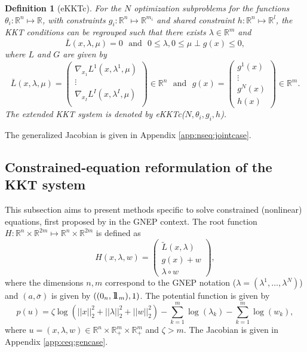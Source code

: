 \documentclass[11pt, a4paper]{article}
\newcommand{\II}{\mbox{\large 1\hskip -0,353em 1}}
\newcommand{\txtm}[1]{\textrm{~~#1~~}}
\newcommand{\R}{\ensuremath{\mathbb{R}}}
\newtheorem{mydef}{Definition}
\begin{document}
\begin{mydef}[eKKTc]
For the $N$ optimization subproblems for the functions $\theta_i: \R^{n} \mapsto \R$, with constraints $g_i: \R^{n} \mapsto \R^{m_i}$ and shared constraint $h:\R^n \mapsto \R^l$, the KKT conditions can be regrouped such that
there exists $\lambda \in \R^m$ and 
$$
\bar L(x, \lambda, \mu) = 0 \txtm{and} 0 \leq \lambda, 0 \leq \mu \perp g(x) \leq  0,
$$
where $L$ and $G$ are given by
$$
\bar L(x, \lambda, \mu) = 
\left( 
\begin{matrix}
\nabla_{x_1} L ^1(x, \lambda^1, \mu) \\
\vdots \\
\nabla_{x_I} L ^I(x, \lambda^I, \mu) \\
\end{matrix}
\right)  
\in \R^{n}
\txtm{and}
g(x) = 
\left( 
\begin{matrix}
g^1(x) \\
\vdots \\
g^N(x) \\
h(x) 
\end{matrix}
\right) 
\in \R^{m}.
$$
The extended KKT system is denoted by eKKTc($N, \theta_i, g_i, h$).
\end{mydef}
The generalized Jacobian is given in Appendix \ref{app:nseq:jointcase}.




\subsection{Constrained-equation reformulation of the KKT system}
This subsection aims to present methods specific to solve constrained (nonlinear) equations, first proposed by \cite{kanzowfacchetal11} in the GNEP context.
The root function $H: \R^n \times \R^{2m} \mapsto  \R^n \times \R^{2m}$ is defined as
$$
H(x, \lambda, w) = 
\left( 
\begin{matrix}
\tilde L(x, \lambda) \\
g(x) + w \\
\lambda \circ w 
\end{matrix}
\right) ,
$$
where the dimensions $n, m$ correspond to the GNEP notation ($ \lambda = (\lambda^1, \dots, \lambda^N)$) and $(a, \bar \sigma)$ is given by $((0_{n}, \II_{m}), 1)$. The potential function is given by
$$
p\left(u \right) = \zeta \log\left( ||x||_2^2 + ||\lambda ||_2^2+ ||w||_2^2 \right) - 
\sum_{k=1}^{m} \log (\lambda_{k}) - \sum_{k=1}^{m} \log (w_{k}),
$$
where $u=(x, \lambda, w) \in \R^n \times \R_{+}^{m} \times \R_{+}^{m}$
and $\zeta > m$. 
The Jacobian is given in Appendix \ref{app:ceq:gencase}.
\end{document}
